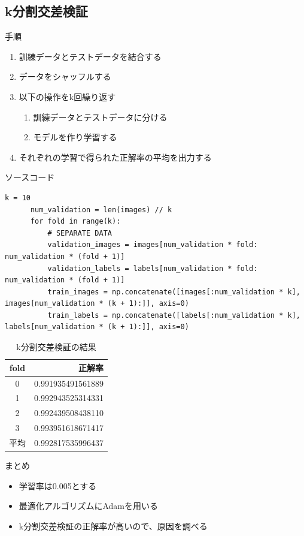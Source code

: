 \documentclass[dvipdfmx]{beamer}
\begin{document}
  \begin{frame}
    \section{k分割交差検証}
  \end{frame}

  \begin{frame}{手順}
    \begin{enumerate}
      \item 訓練データとテストデータを結合する
      \item データをシャッフルする
      \item 以下の操作をk回繰り返す
      \begin{enumerate}
        \item 訓練データとテストデータに分ける
        \item モデルを作り学習する
      \end{enumerate}
      \item それぞれの学習で得られた正解率の平均を出力する
    \end{enumerate}
  \end{frame}

  \begin{frame}[fragile]{ソースコード}
    \begin{lstlisting}[caption=ksparate\_train.py]
      k = 10
      num_validation = len(images) // k
      for fold in range(k):
          # SEPARATE DATA
          validation_images = images[num_validation * fold: num_validation * (fold + 1)]
          validation_labels = labels[num_validation * fold: num_validation * (fold + 1)]
          train_images = np.concatenate([images[:num_validation * k], images[num_validation * (k + 1):]], axis=0)
          train_labels = np.concatenate([labels[:num_validation * k], labels[num_validation * (k + 1):]], axis=0)
      \end{lstlisting}
  \end{frame}

  \begin{frame}
    \begin{table}[H]
      \centering
      \caption{k分割交差検証の結果}
      \begin{tabular}{cr}
        \hline
        fold & 正解率 \\
        \hline \hline
        0 & 0.991935491561889 \\
        1 & 0.992943525314331 \\
        2 & 0.992439508438110 \\
        3 & 0.993951618671417 \\
        \hline \hline
        平均 & 0.992817535996437 \\
        \hline
      \end{tabular}
    \end{table}
  \end{frame}

  \begin{frame}{まとめ}
    \begin{itemize}
      \item 学習率は0.005とする
      \item 最適化アルゴリズムにAdamを用いる
      \item k分割交差検証の正解率が高いので、原因を調べる
    \end{itemize}
  \end{frame}
\end{document}
